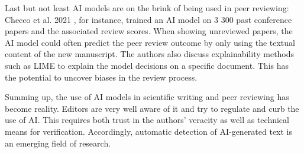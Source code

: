 Last but not least AI models are on the brink of being used in peer reviewing: Checco et al. 2021 \cite{checco2021ai}, for instance, trained an AI model on 3 300 past conference papers and the associated review scores. When showing unreviewed papers, the AI model could often predict the peer review outcome by only using the textual content of the new manuscript. The authors also discuss explainability methods such as LIME to explain the model decisions on a specific document. This has the potential to uncover biases in the review process.

Summing up, the use of AI models in scientific writing and peer reviewing has become reality. Editors are very well aware of it and try to regulate and curb the use of AI. This requires both trust in the authors' veracity as well as technical means for verification. Accordingly, automatic detection of AI-generated text is an emerging field of research.


